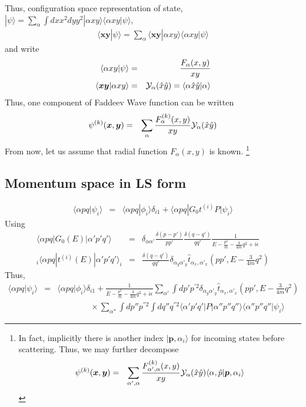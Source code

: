 \documentclass[11pt]{article}
\def\bm{\boldsymbol}
\newcommand{\bea}{\begin{eqnarray}}
\newcommand{\eea}{\end{eqnarray}}
\newcommand{\no}{\nonumber \\}
\newcommand{\vp}{{\bm p}}
\newcommand{\vx}{{\bm x}}
\newcommand{\vy}{{\bm y}}
\newcommand{\la}{\langle}
\newcommand{\ra}{\rangle}
\begin{document}
Thus, configuration space representation of state,
$|\psi\ra=\sum_{\alpha}\int dx x^2 dy y^2
|\alpha x y\ra \la \alpha xy|\psi\ra$,
\bea
\la \vx \vy|\psi\ra=\sum_\alpha \la \vx\vy|\alpha x y\ra 
                    \la \alpha x y|\psi\ra
\eea
and write
\bea
\la \alpha x y|\psi\ra &=&\frac{F_\alpha(x,y)}{xy} \no
\la \vx\vy|\alpha x y\ra&=&{\cal Y}_\alpha(\hat{x}\hat{y})
=\la \alpha \hat{x}\hat{y}|\alpha\ra
\eea
Thus, one component of Faddeev Wave function can be written
\bea
\psi^{(k)}(\vx,\vy)&=&\sum_\alpha \frac{F^{(k)}_\alpha(x,y)}{x y}{\cal Y}_\alpha(\hat{x}\hat{y})
\eea
From now, let us assume that radial function $F_\alpha(x,y)$ is known.
\footnote{
In fact, implicitly there is another index $|\vp,\alpha_i\ra$ for
incoming states before scattering.
Thus, we may further decompose
\bea
\psi^{(k)}(\vx,\vy)&=&\sum_{\alpha',\alpha} 
           \frac{F^{(k)}_{\alpha',\alpha}(x,y)}{x y}
           {\cal Y}_\alpha(\hat{x}\hat{y})
           \la \alpha,\hat{p}|\vp,\alpha_i\ra
\eea
 
}
\subsection{Momentum space in LS form}
\bea
\la \alpha p q|\psi_i\ra
&=&\la \alpha pq|\phi_i\ra\delta_{i1}
  +\la \alpha p q| G_0 t^{(i)}P|\psi_i\ra 
\eea
Using 
\bea
\la \alpha p q|G_0(E)|\alpha' p' q'\ra
&=&\delta_{\alpha\alpha'}\frac{\delta(p-p')}{pp'}\frac{\delta(q-q')}{qq'}\frac{1}{E-\frac{p^2}{m}-\frac{3}{4m}q^2+i\epsilon} \no
{}_i\la \alpha p q|t^{(i)}(E)|\alpha' p' q'\ra_i
&=&\frac{\delta(q-q')}{qq'}
   \delta_{\alpha_y \alpha'_y}
   \hat{t}_{\alpha_x,\alpha'_x}(p p',E-\frac{3}{4m}q^2)
\eea
Thus,
\bea
\la \alpha p q|\psi_i\ra
&=&\la \alpha pq|\phi_i\ra\delta_{i1}
  +\frac{1}{E-\frac{p^2}{m}-\frac{3}{4m}q^2+i\epsilon}
  \sum_{\alpha'}\int dp' p^{'2} \delta_{\alpha_y\alpha'_y}
     \hat{t}_{\alpha_x,\alpha'_x}(p p',E-\frac{3}{4m}q^2)\no
  & &\qquad\qquad\times 
  \sum_{\alpha''}\int dp'' p^{''2}\int dq'' q^{''2}    
  \la \alpha' p' q'| P|\alpha'' p'' q''\ra
  \la\alpha'' p'' q''|\psi_i\ra 
\eea
\end{document}
